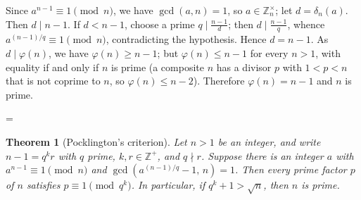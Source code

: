 \documentclass[11pt]{article}
\makeatletter
\theoremstyle{ntstyle}
\newtheorem{theorem}{Theorem}[subsection]
\let\nt@closedisplay\]
\def\nt@guardedclose{\@ifnextchar\par{\nt@closeafterpar}{\@ifnextchar\end{\postdisplaypenalty\@M\nt@closedisplay}{\nt@closedisplay}}}
\def\nt@closeafterpar\par{\@ifnextchar\par{\nt@closeafterpar}{\@ifnextchar\end{\postdisplaypenalty\@M\nt@closedisplay\par}{\nt@closedisplay\par}}}
\renewenvironment{proof}[1][\proofname]{\par
  \pushQED{\qed}\normalfont\topsep\medskipamount\edef\nt@afterproof{\@endparpenalty=\the\@endparpenalty\relax}\@beginparpenalty\@M\@endparpenalty\@M\let\]\nt@guardedclose\trivlist\item[]\textit{#1\@addpunct{.}} \ignorespaces}{\ifvmode\addpenalty\@M\fi\popQED\nt@afterproof\endtrivlist\@endpefalse}
\newcommand{\ZmodUnits}[1]{\mathbb{Z}_{#1}^{\times}}
\makeatother
\begin{document}
\begin{proof} Since $a^{n-1}\equiv1\pmod{n}$,
	we have $\gcd(a, n)=1$, so $a\in\ZmodUnits{n}$; let
	$d=\delta_n(a)$. Then $d\mid n-1$. If $d<n-1$, choose a
	prime $q\mid\tfrac{n-1}{d}$; then $d\mid\tfrac{n-1}{q}$, whence
	$a^{(n-1)/q}\equiv1\pmod{n}$, contradicting the hypothesis. Hence
	$d=n-1$. As $d\mid\varphi(n)$, we have $\varphi(n)\ge n-1$; but $\varphi(n)\le n-1$ for every $n>1$, with equality if and only if $n$ is prime (a composite $n$ has a divisor $p$ with $1<p<n$ that is not coprime to $n$, so $\varphi(n)\le n-2$). Therefore $\varphi(n)=n-1$ and $n$ is prime.

\end{proof}
\begin{theorem}[Pocklington's criterion]\label{thm:9.1.9} Let
	$n>1$ be an integer, and write $n-1=q^{k}r$ with $q$ prime,
	$k,r\in\mathbb{Z}^+$, and $q\nmid r$. Suppose there is an
	integer $a$ with $a^{n-1}\equiv1\pmod{n}$ and
	$\gcd\left(a^{(n-1)/q}-1,\,n\right)=1$. Then every prime factor $p$
	of $n$ satisfies $p\equiv1\pmod{q^{k}}$.
	In particular, if $q^k+1>\sqrt n$, then $n$ is prime.

\end{theorem}
\end{document}
